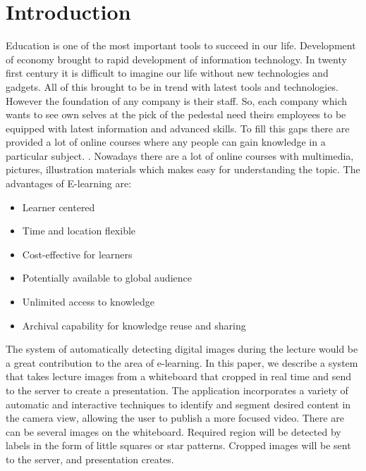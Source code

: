 \chapter{Introduction}

Education is one of the most important tools to succeed in our life. Development of economy brought to rapid development of information technology. In twenty first century it is difficult to imagine our life without new technologies and gadgets. All of this brought to be in trend with latest tools and technologies. However the foundation of any company is their staff. So, each company which wants to see own selves at the pick of the pedestal need theirs employees to be equipped with latest information and advanced skills. \cite{Edith} To fill this gaps there are provided a lot of online courses where any people can gain knowledge in a particular subject. . Nowadays there are a lot of online courses with multimedia, pictures, illustration materials which makes easy for understanding the topic. The advantages of E-learning are:
\begin{itemize}
\item Learner centered
\item Time and location flexible
\item Cost-effective for learners
\item Potentially available to global audience
\item Unlimited access to knowledge
\item Archival capability for knowledge reuse and sharing \cite{Dansong}
\end{itemize}
The system of automatically detecting digital images during the lecture would be a great contribution to the area of e-learning. In this paper, we describe a system that takes lecture images from a whiteboard that cropped in real time and send to the server to create a presentation. The application incorporates a variety of automatic and interactive techniques to identify and segment desired content in the camera view, allowing the user to publish a more focused video. There are can be several images on the whiteboard. Required region will be detected by labels in the form of little squares or star patterns. Cropped images will be sent to the server, and presentation creates.
